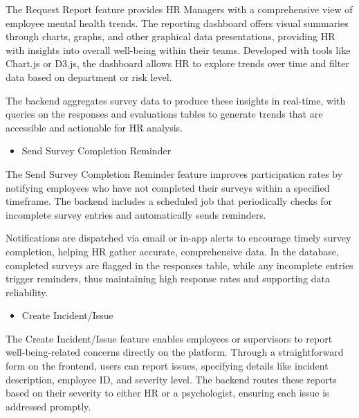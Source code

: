 \documentclass[conference]{IEEEtran}
\begin{document}
            The Request Report feature provides HR Managers with a 
            comprehensive view of employee mental health trends. The 
            reporting dashboard offers visual summaries through charts, 
            graphs, and other graphical data presentations, providing HR
            with insights into overall well-being within their teams. 
            Developed with tools like Chart.js or D3.js, the dashboard 
            allows HR to explore trends over time and filter data based 
            on department or risk level. \newline
     
            The backend aggregates survey 
            data to produce these insights in real-time, with queries on 
            the responses and evaluations tables to generate trends that 
            are accessible and actionable for HR analysis.
            \newline    

            \begin{itemize}
                \item Send Survey Completion Reminder
            \end{itemize}
    
            The Send Survey Completion Reminder feature improves 
            participation rates by notifying employees who have not 
            completed their surveys within a specified timeframe. The 
            backend includes a scheduled job that periodically checks 
            for incomplete survey entries and automatically sends 
            reminders. \newline
    
            Notifications are dispatched via email or in-app 
            alerts to encourage timely survey completion, helping HR gather 
            accurate, comprehensive data. In the database, completed surveys 
            are flagged in the responses table, while any incomplete entries
            trigger reminders, thus maintaining high response rates and 
            supporting data reliability.
            \newline    

            \begin{itemize}
                \item Create Incident/Issue
            \end{itemize}
    
            The Create Incident/Issue feature enables employees or supervisors 
            to report well-being-related concerns directly on the platform. 
            Through a straightforward form on the frontend, users can report 
            issues, specifying details like incident description, employee ID, 
            and severity level. The backend routes these reports based on their 
            severity to either HR or a psychologist, ensuring each issue is 
            addressed promptly. \newline
            
\end{document}
